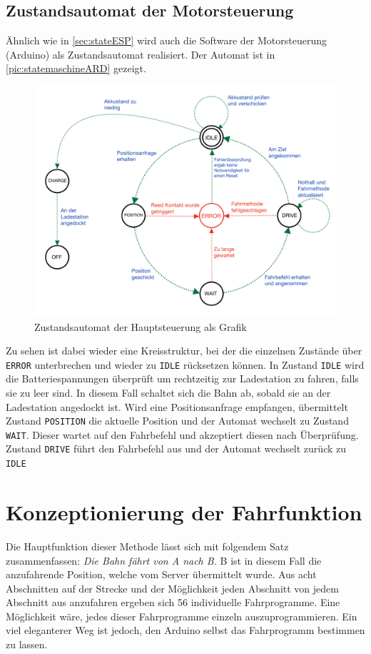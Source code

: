 \subsection{Zustandsautomat der Motorsteuerung}
\label{sec:stateARD}
Ähnlich wie in \autoref{sec:stateESP} wird auch die Software der Motorsteuerung (Arduino) als Zustandsautomat realisiert. 
Der Automat ist in \autoref{pic:statemaschineARD} gezeigt.

\begin{figure}[h]
	\begin{center}
		\includegraphics[width=16cm]{stateMaschineARD.pdf}
		\caption{\label{pic:statemaschineARD}Zustandsautomat der Hauptsteuerung als Grafik}
	\end{center}
\end{figure}

Zu sehen ist dabei wieder eine Kreisstruktur, bei der die einzelnen Zustände über \texttt{ERROR} unterbrechen und wieder zu \texttt{IDLE} rücksetzen können. In Zustand \texttt{IDLE} wird die Batteriespannungen überprüft um rechtzeitig zur Ladestation zu fahren, falls sie zu leer sind. In diesem Fall schaltet sich die Bahn ab, sobald sie an der Ladestation angedockt ist. Wird eine Positionsanfrage empfangen, übermittelt Zustand \texttt{POSITION} die aktuelle Position und der Automat wechselt zu Zustand \texttt{WAIT}. Dieser wartet auf den Fahrbefehl und akzeptiert diesen nach Überprüfung. Zustand \texttt{DRIVE} führt den Fahrbefehl aus und der Automat wechselt zurück zu \texttt{IDLE}

\section{Konzeptionierung der Fahrfunktion}
\label{sec:konFahr}
Die Hauptfunktion dieser Methode lässt sich mit folgendem Satz zusammenfassen: \textit{Die Bahn fährt von A nach B.} B ist in diesem Fall die anzufahrende Position, welche vom Server übermittelt wurde. Aus acht Abschnitten auf der Strecke und der Möglichkeit jeden Abschnitt von jedem Abschnitt aus anzufahren ergeben sich 56 individuelle Fahrprogramme. Eine Möglichkeit wäre, jedes dieser Fahrprogramme einzeln auszuprogrammieren. Ein viel eleganterer Weg ist jedoch, den Arduino selbst das Fahrprogramm bestimmen zu lassen. 

